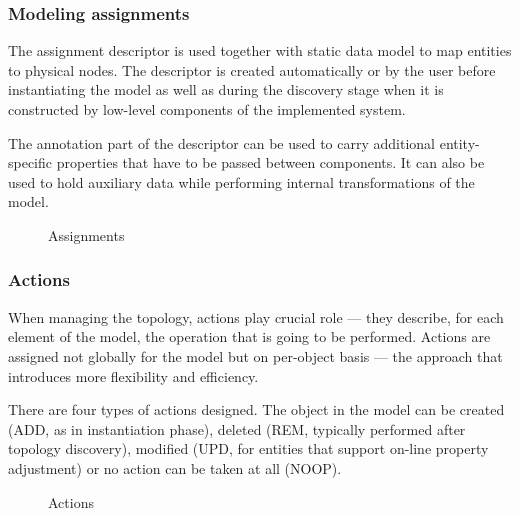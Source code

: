 \documentclass[11pt,openany]{book}
\begin{document}
        \subsubsection{Modeling assignments}

          The assignment descriptor is used together with static data model to map entities to physical nodes. The
          descriptor is created automatically or by the user before instantiating the model as well as during the
          discovery stage when it is constructed by low-level components of the implemented system.

          The annotation part of the descriptor can be used to carry additional entity-specific properties that have to
          be passed between components. It can also be used to hold auxiliary data while performing internal
          transformations of the model.

          \begin{figure}[H]
            \centering

          
            \caption{Assignments}
          \end{figure}


        \subsubsection{Actions}

          When managing the topology, actions play crucial role --- they describe, for each element of the model, the
          operation that is going to be performed. Actions are assigned not globally for the model but on per-object
          basis --- the approach that introduces more flexibility and efficiency.

          There are four types of actions designed. The object in the model can be created (ADD, as in instantiation
          phase), deleted (REM, typically performed after topology discovery), modified (UPD, for entities that support
          on-line property adjustment) or no action can be taken at all (NOOP).

          \begin{figure}[H]
            \centering

          
            \caption{Actions}
          \end{figure}
\end{document}
